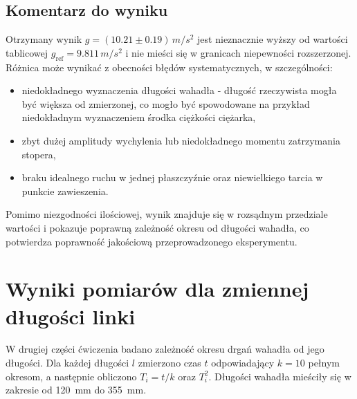 \documentclass{fizykalab}
\begin{document}
\subsection{Komentarz do wyniku}

Otrzymany wynik \( g = (10.21 \pm 0.19)\,\si{m/s^2} \)
jest nieznacznie wyższy od wartości tablicowej
\( g_\text{ref} = 9.811\,\si{m/s^2} \)
i nie mieści się w granicach niepewności rozszerzonej.
Różnica może wynikać z obecności błędów systematycznych,
w szczególności:
\begin{itemize}
  \item niedokładnego wyznaczenia długości wahadła -
    długość rzeczywista mogła być większa od zmierzonej,
    co mogło być spowodowane na przykład niedokładnym wyznaczeniem
    środka ciężkości ciężarka,
  \item zbyt dużej amplitudy wychylenia lub niedokładnego
    momentu zatrzymania stopera,
  \item braku idealnego ruchu w jednej płaszczyźnie oraz
    niewielkiego tarcia w punkcie zawieszenia.
\end{itemize}
Pomimo niezgodności ilościowej,
wynik znajduje się w rozsądnym przedziale wartości
i pokazuje poprawną zależność okresu od długości wahadła,
co potwierdza poprawność jakościową przeprowadzonego eksperymentu.

\pagebreak

\section{Wyniki pomiarów dla zmiennej długości linki}

W drugiej części ćwiczenia badano zależność okresu drgań wahadła
od jego długości. Dla każdej długości \(l\) zmierzono czas \(t\)
odpowiadający \(k = 10\) pełnym okresom, a następnie obliczono
\(T_i = t/k\) oraz \(T_i^2\).
Długości wahadła mieściły się w zakresie
od \SI{120}{\milli\meter} do \SI{355}{\milli\meter}.
\end{document}
